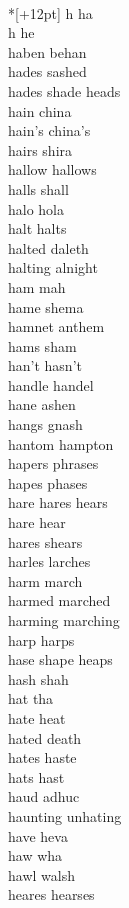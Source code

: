 \vspace{14pt}
\noindent\notextbf{\LargeH}\\*[+12pt]
h ha \\
h he \\
haben behan\\
hades sashed \\
hades shade heads\\
hain china \\
hain's china's \\
hairs shira\\
hallow hallows \\
halls shall\\
halo hola\\
halt halts \\
halted daleth\\
halting alnight\\
ham mah\\
hame shema \\
hamnet anthem\\
hams sham\\
han't hasn't \\
handle handel\\
hane ashen \\
hangs gnash\\
hantom hampton \\
hapers phrases \\
hapes phases \\
hare hares hears \\
hare hear\\
hares shears \\
harles larches \\
harm march \\
harmed marched \\
harming marching \\
harp harps \\
hase shape heaps \\
hash shah\\
hat tha\\
hate heat\\
hated death\\
hates haste\\
hats hast\\
haud adhuc \\
haunting unhating\\
have heva\\
haw wha\\
hawl walsh \\
heares hearses \\
